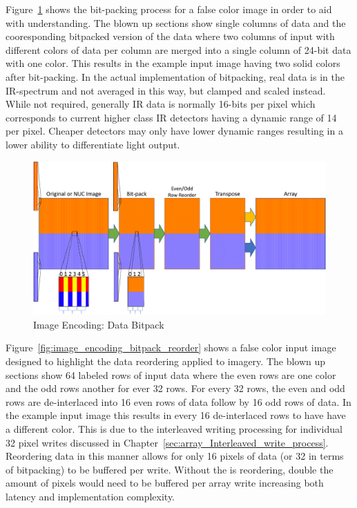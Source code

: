     Figure~\ref{fig:image_encoding_bitback} shows the bit-packing process for a false color image in order to aid with understanding. The blown up sections show single columns of data and the cooresponding bitpacked version of the data where two columns of input with different colors of data per column are merged into a single column of 24-bit data with one color. This results in the example input image having two solid colors after bit-packing. In the actual implementation of bitpacking, real data is in the IR-spectrum and not averaged in this way, but clamped and scaled instead. While not required, generally IR data is normally 16-bits per pixel which corresponds to current higher class IR detectors having a dynamic range of 14 per pixel\cite{FLIR1, FLIR2, FLIR3}. Cheaper detectors may only have lower dynamic ranges resulting in a lower ability to differentiate light output.

    \begin{figure}
        \centering
        \includegraphics[width=1.0\textwidth]{fig/image_encoding_bitback.pdf}
        \caption{Image Encoding: Data Bitpack}
        \label{fig:image_encoding_bitback}
    \end{figure}

    Figure~\ref{fig:image_encoding_bitpack_reorder} shows a false color input image designed to highlight the data reordering applied to imagery. The blown up sections show 64 labeled rows of input data where the even rows are one color and the odd rows another for ever 32 rows. For every 32 rows, the even and odd rows are de-interlaced into 16 even rows of data follow by 16 odd rows of data. In the example input image this results in every 16 de-interlaced rows to have have a different color. This is due to the interleaved writing processing for individual 32 pixel writes discussed in Chapter~\ref{sec:array_Interleaved_write_process}. Reordering data in this manner allows for only 16 pixels of data (or 32 in terms of bitpacking) to be buffered per write. Without the is reordering, double the amount of pixels would need to be buffered per array write increasing both latency and implementation complexity.


